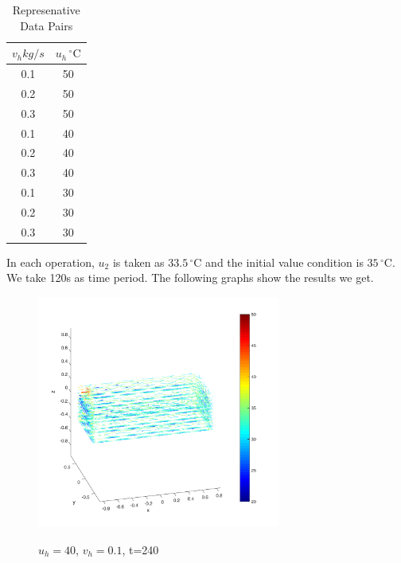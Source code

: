 \documentclass[12pt,a4paper,titlepage]{article}
\begin{document}
\begin{table}
\begin{center}
\begin{tabular}{c|c}
\hline
    $v_h kg/s$  &${u_h}\,^{\circ}\mathrm{C}$        \\ \hline
     0.1             & 50              \\ \hline
    0.2             & 50              \\ \hline
     0.3             & 50              \\ \hline
     0.1             & 40              \\ \hline
     0.2             & 40              \\ \hline
     0.3             & 40              \\ \hline
     0.1             & 30              \\ \hline
     0.2             & 30              \\ \hline
     0.3             & 30              \\ \hline
\end{tabular}
\end{center}
\caption{Represenative Data Pairs}\label{3_t}
\end{table}

In each operation, $u_2$ is taken as $33.5\,^{\circ}\mathrm{C}$
and the initial value condition is $35\,^{\circ}\mathrm{C}$.
 We take 120s as time period. The following graphs show the results we get.

\begin{figure}[htb]
  \centering
  \includegraphics[width=8cm]{6-2.pdf}\\
  \caption{$u_h=40$, $v_h=0.1$, t=240}\label{5_p}
\end{figure}
\end{document}
